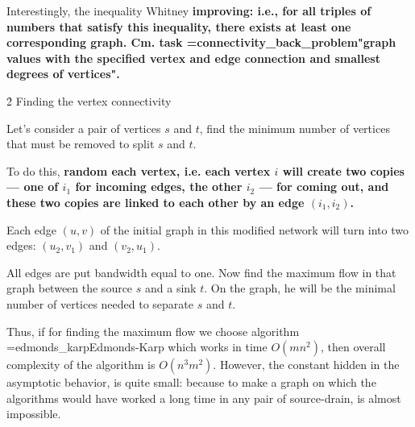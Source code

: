 Interestingly, the inequality Whitney \bf{improving}: i.e., for all triples of numbers that satisfy this inequality, there exists at least one corresponding graph. Cm. task \algohref=connectivity_back_problem{"graph values with the specified vertex and edge connection and smallest degrees of vertices"}.


\h2{ Finding the vertex connectivity }

Let's consider a pair of vertices $s$ and $t$, find the minimum number of vertices that must be removed to split $s$ and $t$.

To do this, \bf{random} each vertex, i.e. each vertex $i$ will create two copies --- one of $i_1$ for incoming edges, the other $i_2$ --- for coming out, and these two copies are linked to each other by an edge $(i_1, i_2)$.

Each edge $(u,v)$ of the initial graph in this modified network will turn into two edges: $(u_2, v_1)$ and $(v_2, u_1)$.

All edges are put bandwidth equal to one. Now find the maximum flow in that graph between the source $s$ and a sink $t$. On the graph, he will be the minimal number of vertices needed to separate $s$ and $t$.

Thus, if for finding the maximum flow we choose algorithm \algohref=edmonds_karp{Edmonds-Karp} which works in time $O (m n^2)$, then overall complexity of the algorithm is $O (n^3 m^2)$. However, the constant hidden in the asymptotic behavior, is quite small: because to make a graph on which the algorithms would have worked a long time in any pair of source-drain, is almost impossible.

